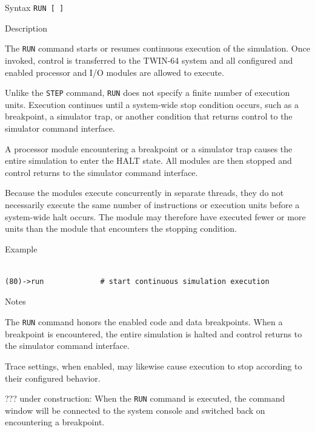 %
%
\pagebreak
{}

\begin{iPageDescEntry}{Syntax}
\texttt{RUN [  ]} \
\end{iPageDescEntry}

\begin{iPageDescEntry}{Description}

The \texttt{RUN} command starts or resumes continuous execution of the
simulation. Once invoked, control is transferred to the TWIN-64 system and
all configured and enabled processor and I/O modules are allowed to execute.

Unlike the \texttt{STEP} command, \texttt{RUN} does not specify a finite
number of execution units. Execution continues until a system-wide stop
condition occurs, such as a breakpoint, a simulator trap, or another
condition that returns control to the simulator command interface.

A processor module encountering a breakpoint or a simulator trap causes the
entire simulation to enter the HALT state. All modules are then stopped and
control returns to the simulator command interface.

Because the modules execute concurrently in separate threads, they do not
necessarily execute the same number of instructions or execution units before
a system-wide halt occurs. The module may therefore have executed fewer or 
more units than the module that encounters the stopping condition.

\end{iPageDescEntry}

\begin{iPageDescOpEntry}{Example}
\begin{lstlisting}[style=iPageOpStyle]

(80)->run             # start continuous simulation execution

\end{lstlisting}
\end{iPageDescOpEntry}

\begin{iPageDescEntry}{Notes}

The \texttt{RUN} command honors the enabled code and data breakpoints.
When a breakpoint is encountered, the entire simulation is halted and
control returns to the simulator command interface.

Trace settings, when enabled, may likewise cause execution to stop according
to their configured behavior.

??? under construction: When the \texttt{RUN} command is executed, the command
window will be connected to the system console and switched back on encountering
a breakpoint.

\end{iPageDescEntry}
